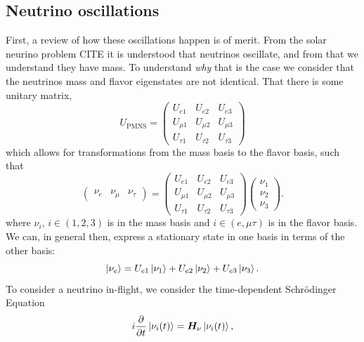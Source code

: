 \documentclass[main.tex]{subfiles}
\begin{document}
\subsection{Neutrino oscillations}

First, a review of how these oscillations happen is of merit. From the solar neurino problem CITE it is understood that neutrinos oscillate, and from that we understand they have mass. To understand \textit{why} that is the case we consider that the neutrinos mass and flavor eigenstates are not identical. That there is some unitary matrix, 
\begin{equation}
    U_{\text{PMNS}} = \left(\begin{array}{ccc} U_{e1} & U_{e2} & U_{e3} \\ U_{\mu 1} & U_{\mu 2} & U_{\mu 3} \\ U_{\tau 1} & U_{\tau 2} & U_{\tau 3} \end{array}\right)
\end{equation}
which allows for transformations from the mass basis to the flavor basis, such that
\begin{equation}
    \left(\begin{array}{ccc} \nu_{e} & \nu_{\mu} & \nu_{\tau} \end{array}\right)  = \left(\begin{array}{ccc} U_{e1} & U_{e2} & U_{e3} \\ U_{\mu 1} & U_{\mu 2} & U_{\mu 3} \\ U_{\tau 1} & U_{\tau 2} & U_{\tau 3} \end{array}\right) \left(\begin{array}{c} \nu_{1} \\ \nu_{2} \\ \nu_{3} \end{array}\right).
\end{equation}
where $\nu_{i}$, $i\in\left(1,2,3\right)$ is in the mass basis and $i\in\left(e,\mu\tau\right)$ is in the flavor basis. 
We can, in general then, express a stationary state in one basis in terms of the other basis:
\begin{equation}\label{eq:nunu}
    \left| \nu_{e} \right > = U_{e1} \left| \nu_{1} \right > + U_{e2} \left| \nu_{2} \right > + U_{e3}\left| \nu_{3} \right >.
\end{equation}
To consider a neutrino in-flight, we consider the time-dependent Schr\"odinger Equation
\begin{equation}
    i\dfrac{\partial}{\partial t} \left| \nu_{i} (t) \right > = \bm{H}_{\nu}\left| \nu_{i}(t) \right >,
\end{equation}
\end{document}
